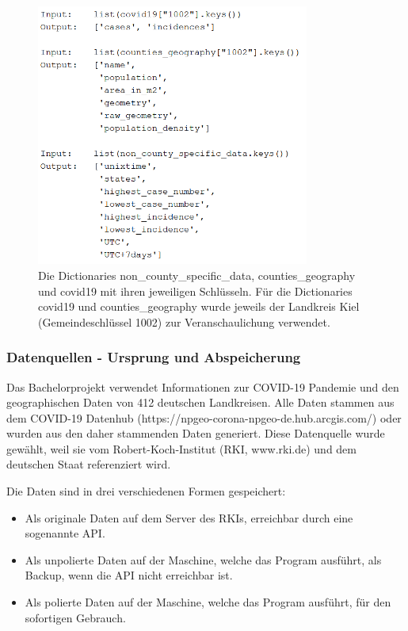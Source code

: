 \begin{figure}[H]
    \centering
    \includegraphics[width=0.8\textwidth]{figures/Dictionarys Bachelorprojekt.png}
    \caption{
    Die Dictionaries non\_county\_specific\_data, counties\_geography und covid19 mit ihren jeweiligen Schlüsseln.
    Für die Dictionaries covid19 und counties\_geography wurde jeweils der Landkreis Kiel (Gemeindeschlüssel 1002) zur Veranschaulichung verwendet.}
    \label{fig:my_label}
\end{figure}


\subsubsection{Datenquellen - Ursprung und Abspeicherung}
Das Bachelorprojekt verwendet Informationen zur COVID-19 Pandemie und den geographischen Daten von 412 deutschen Landkreisen. Alle Daten stammen aus dem \glqq{}COVID-19 Datenhub\grqq{} (https://npgeo-corona-npgeo-de.hub.arcgis.com/) oder wurden aus den daher stammenden Daten generiert. Diese Datenquelle wurde gewählt, weil sie vom Robert-Koch-Institut (RKI, www.rki.de) und dem deutschen Staat referenziert wird.

Die Daten sind in drei verschiedenen Formen gespeichert:
\begin{itemize}
    \item Als originale Daten auf dem Server des RKIs, erreichbar durch eine sogenannte API.
    \item Als unpolierte Daten auf der Maschine, welche das Program ausführt, als Backup, wenn die API nicht erreichbar ist.
    \item Als polierte Daten auf der Maschine, welche das Program ausführt, für den sofortigen Gebrauch.
\end{itemize}

